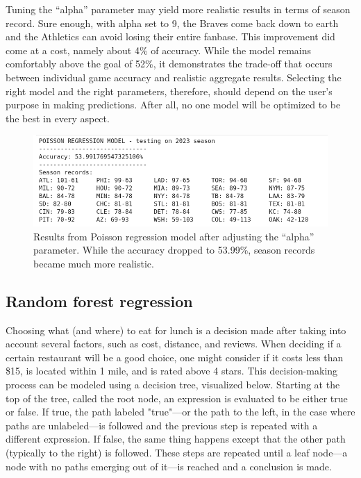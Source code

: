 \documentclass{paper}
\begin{document}
Tuning the ``alpha'' parameter may yield more realistic results in terms of season record. Sure enough, with alpha set to 9, the Braves come back down to earth and the Athletics can avoid losing their entire fanbase. This improvement did come at a cost, namely about 4\% of accuracy. While the model remains comfortably above the goal of 52\%, it demonstrates the trade-off that occurs between individual game accuracy and realistic aggregate results. Selecting the right model and the right parameters, therefore, should depend on the user's purpose in making predictions. After all, no one model will be optimized to be the best in every aspect.

\begin{figure}[H]
  \centering
  \includegraphics[width=13cm]{fig6}
  \caption{Results from Poisson regression model after adjusting the ``alpha'' parameter. While the accuracy dropped to 53.99\%, season records became much more realistic.}
\end{figure}

\subsection{Random forest regression}
Choosing what (and where) to eat for lunch is a decision made after taking into account several factors, such as cost, distance, and reviews. When deciding if a certain restaurant will be a good choice, one might consider if it costs less than \$15, is located within 1 mile, and is rated above 4 stars. This decision-making process can be modeled using a decision tree, visualized below. Starting at the top of the tree, called the root node, an expression is evaluated to be either true or false. If true, the path labeled "true"---or the path to the left, in the case where paths are unlabeled---is followed and the previous step is repeated with a different expression. If false, the same thing happens except that the other path (typically to the right) is followed. These steps are repeated until a leaf node---a node with no paths emerging out of it---is reached and a conclusion is made.
\end{document}

